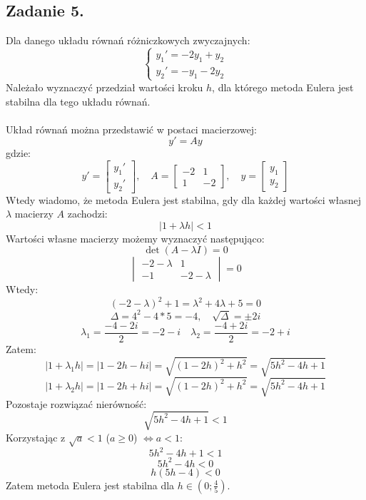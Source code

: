\documentclass{article}
\begin{document}
\subsection{Zadanie 5.}
Dla danego układu równań różniczkowych zwyczajnych:
\begin{equation}
    \begin{cases}
        y_1' = -2y_1 + y_2 \\
        y_2' = -y_1 - 2y_2
    \end{cases} \nonumber
\end{equation}
Należało wyznaczyć przedział wartości kroku $h$, dla którego metoda Eulera jest stabilna dla tego układu równań.
\\\\
Układ równań można przedstawić w postaci macierzowej:
$$y' = Ay$$
gdzie:
\begin{equation}
    y' =
    \begin{bmatrix}
        y_1' \\ y_2'
    \end{bmatrix}
    ,\quad
    A =
    \begin{bmatrix}
        -2 & 1 \\
        1 & -2
    \end{bmatrix}
    ,\quad
    y =
    \begin{bmatrix}
        y_1 \\ y_2
    \end{bmatrix}
\nonumber
\end{equation}
Wtedy wiadomo, że metoda Eulera jest stabilna, gdy dla każdej wartości własnej $\lambda$ macierzy $A$ zachodzi:
$$|1 + \lambda h| < 1 $$
Wartości własne macierzy możemy wyznaczyć następująco:
$$\det(A-\lambda I) = 0 $$
\begin{equation}
    \begin{vmatrix}
        -2-\lambda & 1 \\
        -1 & -2-\lambda
    \end{vmatrix}
    = 0
\nonumber
\end{equation}
Wtedy:
$$(-2-\lambda)^2 + 1 = \lambda^2 + 4\lambda + 5 = 0$$
$$\Delta = 4^2 - 4*5 = -4, \quad \sqrt{\Delta} = \pm2i$$
$$\lambda_1 = \frac{-4-2i}{2} = -2-i \quad \lambda_2 = \frac{-4+2i}{2} = -2+i$$
Zatem:
$$|1+\lambda_1 h| = |1-2h-hi| = \sqrt{(1-2h)^2 + h^2} = \sqrt{5h^2 - 4h + 1}$$
$$|1+\lambda_2 h| = |1-2h+hi| = \sqrt{(1-2h)^2 + h^2} = \sqrt{5h^2 - 4h + 1}$$
Pozostaje rozwiązać nierówność:
$$\sqrt{5h^2 - 4h + 1} < 1$$
Korzystając z $\sqrt{a} < 1$ ($a \geq 0$) $\iff a < 1$:
$$5h^2 - 4h + 1 < 1$$
$$5h^2 - 4h < 0$$
$$h(5h - 4) < 0$$
Zatem metoda Eulera jest stabilna dla $h \in ( 0;\frac{4}{5})$.
\end{document}
